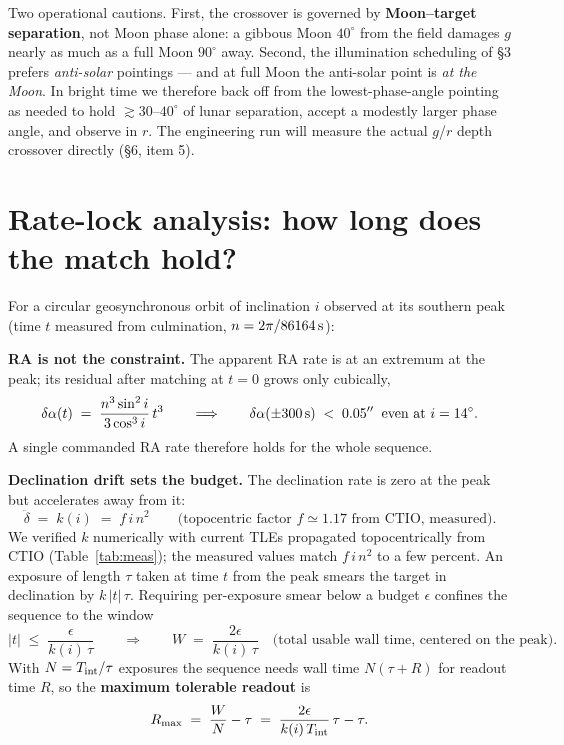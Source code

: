 \documentclass[11pt]{article}
\newcommand{\arcsecs}{\ensuremath{''}}
\begin{document}
Two operational cautions. First, the crossover is governed by \textbf{Moon--target
separation}, not Moon phase alone: a gibbous Moon $40^{\circ}$ from the field damages $g$
nearly as much as a full Moon $90^{\circ}$ away. Second, the illumination scheduling of
\S3 prefers \emph{anti-solar} pointings --- and at full Moon the anti-solar point is
\emph{at the Moon}. In bright time we therefore back off from the lowest-phase-angle
pointing as needed to hold $\gtrsim 30$--$40^{\circ}$ of lunar separation, accept a
modestly larger phase angle, and observe in $r$. The engineering run will measure the
actual $g$/$r$ depth crossover directly (\S6, item 5).

\section{Rate-lock analysis: how long does the match hold?}
\label{sec:ratelock}

For a circular geosynchronous orbit of inclination $i$ observed at its southern peak
(time $t$ measured from culmination, $n = 2\pi/86164\,{\rm s}$):

\medskip
\noindent\textbf{RA is not the constraint.} The apparent RA rate is at an extremum at
the peak; its residual after matching at $t=0$ grows only cubically,
\begin{equation}
\delta\alpha(t) \;=\; \frac{n^{3}\sin^{2}i}{3\cos^{3}i}\,t^{3}
\qquad\Longrightarrow\qquad
\delta\alpha(\pm300\,{\rm s}) \;<\; 0.05\arcsecs
\;\;\text{even at } i=14^{\circ}.
\end{equation}
A single commanded RA rate therefore holds for the whole sequence.

\medskip
\noindent\textbf{Declination drift sets the budget.} The declination rate is zero at the
peak but accelerates away from it:
\begin{equation}
\ddot\delta \;=\; k(i) \;=\; f\, i\, n^{2}
\qquad\text{(topocentric factor } f \simeq 1.17 \text{ from CTIO, measured)} .
\end{equation}
We verified $k$ numerically with current TLEs propagated topocentrically from CTIO
(Table~\ref{tab:meas}); the measured values match $f\,i\,n^{2}$ to a few percent.
An exposure of length $\tau$ taken at time $t$ from the peak smears the target in
declination by $k\,|t|\,\tau$. Requiring per-exposure smear below a budget
$\epsilon$ confines the sequence to the window
\begin{equation}
|t| \;\le\; \frac{\epsilon}{k(i)\,\tau}
\qquad\Longrightarrow\qquad
W \;=\; \frac{2\epsilon}{k(i)\,\tau}
\quad\text{(total usable wall time, centered on the peak).}
\end{equation}
With $N=T_{\rm int}/\tau$ exposures the sequence needs wall time $N(\tau+R)$ for
readout time $R$, so the \textbf{maximum tolerable readout} is
\begin{equation}
R_{\max} \;=\; \frac{W}{N} - \tau \;=\; \frac{2\epsilon}{k(i)\,T_{\rm int}}\,\tau - \tau .
\label{eq:rmax}
\end{equation}
\end{document}
